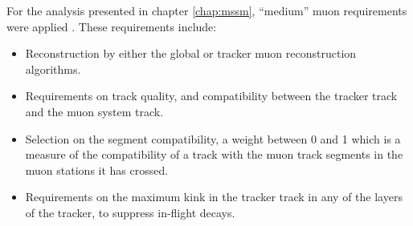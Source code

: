 For the analysis presented in chapter \ref{chap:mssm}, ``medium'' muon requirements were applied \cite{CMS-PAS-HIG-16-037}.
These requirements include:
\begin{itemize}
\setlength{\itemsep}{-0.5\baselineskip}
\item Reconstruction by either the global or tracker muon reconstruction algorithms.
\item Requirements on track quality, and compatibility between the tracker track and the muon system track.
\item Selection on the segment compatibility, a weight between 0 and 1 which is a measure of the compatibility
of a track with the muon track segments in the muon stations it has crossed.
\item Requirements on the maximum kink in the tracker track in any of the layers of the tracker, to suppress in-flight decays.
\end{itemize}
